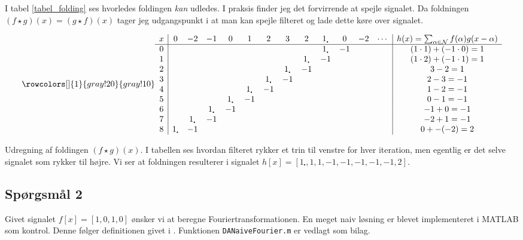 \documentclass[a4paper, 10pt, danish, final]{article}
\begin{document}
I tabel \ref{tabel_folding} ses hvorledes foldingen
\emph{kan} udledes. I praksis finder jeg det forvirrende at spejle
signalet. Da foldningen $(f \star g)(x) = (g \star f)(x)$ tager jeg
udgangspunkt i at man kan spejle filteret og lade dette køre over
signalet.

\begin{table}[t]
    \begin{equation}
        \rowcolors[]{1}{gray!20}{gray!10}
        \begin{array}{c|cccccccccccc|c}
            x & 0 & -2 & -1 & 0 & 1 & 2 & 3 & 2 & 1_{\centerdot} & 0 & -2 & \cdots & h(x) = \sum_{\alpha \in \mathcal{N}}f(\alpha)g(x - \alpha)\\\hline
            0&&&&&&&&&1_\centerdot & -1 &&& (1\cdot 1) + (-1 \cdot 0) = 1\\
            1&&&&&&&&1_\centerdot & -1 &&&& (1\cdot 2) + (-1 \cdot 1) = 1\\
            2&&&&&&&1_\centerdot & -1 &&&&& 3 - 2 = 1\\
            3&&&&&&1_\centerdot & -1 &&&&&& 2 - 3 = -1\\
            4&&&&&1_\centerdot & -1 &&&&&&& 1 - 2 = -1\\
            5&&&&1_\centerdot & -1 &&&&&&&& 0 - 1 = -1\\
            6&&&1_\centerdot & -1 &&&&&&&&& -1 + 0 = -1\\
            7&&1_\centerdot & -1 &&&&&&&&&& -2 + 1 = -1\\
            8&1_\centerdot & -1 &&&&&&&&&&& 0 + -(-2) = 2
        \end{array}\nonumber
    \end{equation}
    \caption{Udregning af foldingen $(f \star g)(x)$. I tabellen ses
    hvordan filteret rykker et trin til venstre for hver iteration, men
    egentlig er det selve signalet som rykker til højre. Vi ser at
    foldningen resulterer i signalet $h[x] = [1_\centerdot, 1, 1, -1,
    -1, -1, -1, -1,
    2]$.}
    \label{tabel_folding}
\end{table}

\subsection*{Spørgsmål 2}
Givet signalet $f[x] = [1, 0, 1, 0]$ ønsker vi at beregne
Fouriertransformationen. En meget naiv løsning er blevet implementeret i
MATLAB som kontrol. Denne følger definitionen givet i \citep[ligning
2.14, s. 16]{soereninout}. Funktionen \texttt{DANaiveFourier.m} er
vedlagt som bilag.
\end{document}

